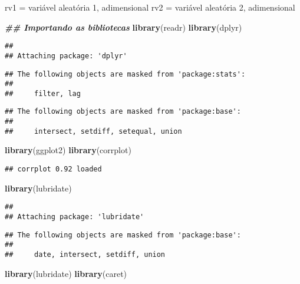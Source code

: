 \documentclass[
]{article}
\newenvironment{Shaded}{\begin{snugshade}}{\end{snugshade}}
\newcommand{\DocumentationTok}[1]{\textcolor[rgb]{0.56,0.35,0.01}{\textbf{\textit{#1}}}}
\newcommand{\FunctionTok}[1]{\textcolor[rgb]{0.13,0.29,0.53}{\textbf{#1}}}
\newcommand{\NormalTok}[1]{#1}
\begin{document}
rv1 = variável aleatória 1, adimensional rv2 = variável aleatória 2,
adimensional

\begin{Shaded}
\begin{Highlighting}[]
\DocumentationTok{\#\# Importando as bibliotecas}
\FunctionTok{library}\NormalTok{(readr)}
\FunctionTok{library}\NormalTok{(dplyr)}
\end{Highlighting}
\end{Shaded}

\begin{verbatim}
## 
## Attaching package: 'dplyr'
\end{verbatim}

\begin{verbatim}
## The following objects are masked from 'package:stats':
## 
##     filter, lag
\end{verbatim}

\begin{verbatim}
## The following objects are masked from 'package:base':
## 
##     intersect, setdiff, setequal, union
\end{verbatim}

\begin{Shaded}
\begin{Highlighting}[]
\FunctionTok{library}\NormalTok{(ggplot2)}
\FunctionTok{library}\NormalTok{(corrplot)}
\end{Highlighting}
\end{Shaded}

\begin{verbatim}
## corrplot 0.92 loaded
\end{verbatim}

\begin{Shaded}
\begin{Highlighting}[]
\FunctionTok{library}\NormalTok{(lubridate)}
\end{Highlighting}
\end{Shaded}

\begin{verbatim}
## 
## Attaching package: 'lubridate'
\end{verbatim}

\begin{verbatim}
## The following objects are masked from 'package:base':
## 
##     date, intersect, setdiff, union
\end{verbatim}

\begin{Shaded}
\begin{Highlighting}[]
\FunctionTok{library}\NormalTok{(lubridate)}
\FunctionTok{library}\NormalTok{(caret)}
\end{Highlighting}
\end{Shaded}
\end{document}
